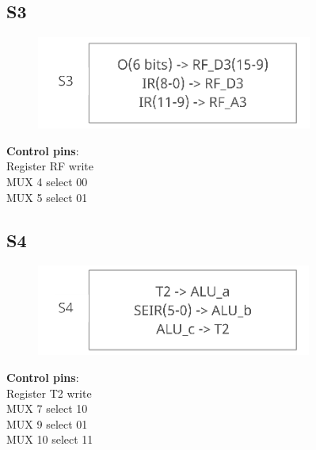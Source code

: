 \documentclass[11pt, fleqn]{article}
\begin{document}
\subsection*{\centering S3}
\begin{figure}[H]
    \centering
    \includegraphics{DataPath/DataPath_S3.PNG}
\end{figure}
\begin{center}
\textbf{Control pins}: \\
Register RF write \\
MUX 4 select 00 \\
MUX 5 select 01 \\
\end{center}

\bigskip

\subsection*{\centering S4}
\begin{figure}[H]
    \centering
    \includegraphics{DataPath/DataPath_S4.PNG}
\end{figure}
\begin{center}
\textbf{Control pins}: \\
Register T2 write \\
MUX 7 select 10 \\
MUX 9 select 01 \\
MUX 10 select 11 \\
\end{center}

\bigskip
\end{document}
